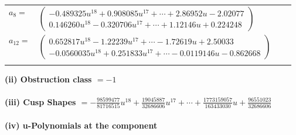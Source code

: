 \documentclass[1p]{elsarticle_modified}
\theoremstyle{definition}
\begin{document}
\begin{tabular}{m{7pt} m{180pt} m{7pt} m{180pt} }
\flushright $a_{8}=$&$\begin{pmatrix}-0.489325 u^{18}+0.908085 u^{17}+\cdots+2.86952 u-2.02077\\0.146260 u^{18}-0.320706 u^{17}+\cdots+1.12146 u+0.224248\end{pmatrix}$ \\
\flushright $a_{12}=$&$\begin{pmatrix}0.652817 u^{18}-1.22239 u^{17}+\cdots-1.72619 u+2.50033\\-0.0560035 u^{18}+0.251833 u^{17}+\cdots-0.0119146 u-0.862668\end{pmatrix}$\\&\end{tabular}
\flushleft \textbf{(ii) Obstruction class $= -1$}\\~\\
\flushleft \textbf{(iii) Cusp Shapes $= -\frac{98599477}{81716515} u^{18}+\frac{19045887}{32686606} u^{17}+\cdots+\frac{1773159057}{163433030} u+\frac{96551023}{32686606}$}\\~\\
\newpage\renewcommand{\arraystretch}{1}
\flushleft \textbf{(iv) u-Polynomials at the component}\newline \\
\end{document}
